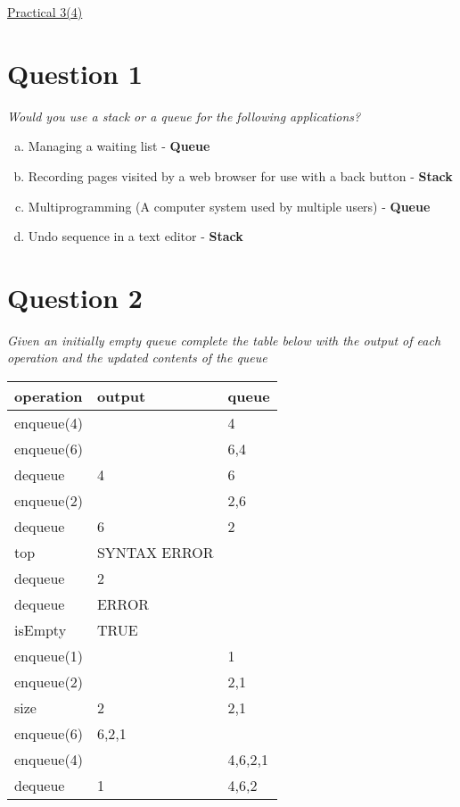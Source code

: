 \documentclass{article}[18pt]
\begin{document}
\begin{center}
\underline{\huge Practical 3(4)}
\end{center}
\section{Question 1}
\textit{Would you use a stack or a queue for the following applications?}
\begin{enumerate}[(a)]
\item Managing a waiting list - \textbf{Queue}
\item Recording pages visited by a web browser for use with a back button  - \textbf{Stack}
\item Multiprogramming (A computer system used by multiple users) - \textbf{Queue}
\item Undo sequence in a text editor  - \textbf{Stack}
\end{enumerate}
\section{Question 2}
\textit{Given an initially empty queue complete the table below with the output of each operation and the updated contents of the queue}
\begin{tabular}{l|l|l}
operation&output&queue\\
\hline
enqueue(4)&&4\\
enqueue(6)&&6,4\\
dequeue&4&6\\
enqueue(2)&&2,6\\
dequeue&6&2\\
top&SYNTAX ERROR&\\
dequeue&2&\\
dequeue&ERROR&\\
isEmpty&TRUE&\\
enqueue(1)&&1\\
enqueue(2)&&2,1\\
size&2&2,1\\
enqueue(6)&6,2,1\\
enqueue(4)&&4,6,2,1\\
dequeue&1&4,6,2
\end{tabular}
\end{document}
